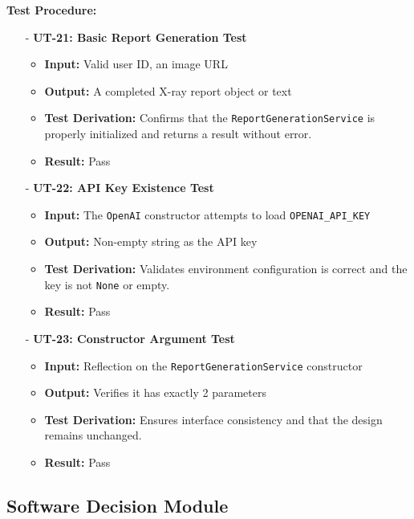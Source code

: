 \documentclass[12pt, titlepage]{article}
\begin{document}
\noindent \textbf{Test Procedure:}
\begin{itemize}
    \item[-] \textbf{UT-21: Basic Report Generation Test} \label{test:xray-basic-report}
    \begin{itemize}
        \item \textbf{Input:} Valid user ID, an image URL
        \item \textbf{Output:} A completed X-ray report object or text
        \item \textbf{Test Derivation:} Confirms that the \texttt{ReportGenerationService} is properly initialized and returns a result without error.
        \item \textbf{Result:} Pass
    \end{itemize}

    \item[-] \textbf{UT-22: API Key Existence Test} \label{test:xray-apikey}
    \begin{itemize}
        \item \textbf{Input:} The \texttt{OpenAI} constructor attempts to load \verb|OPENAI_API_KEY|
        \item \textbf{Output:} Non-empty string as the API key
        \item \textbf{Test Derivation:} Validates environment configuration is correct and the key is not \texttt{None} or empty.
        \item \textbf{Result:} Pass
    \end{itemize}

    \item[-] \textbf{UT-23: Constructor Argument Test} \label{test:xray-ctor-arg}
    \begin{itemize}
        \item \textbf{Input:} Reflection on the \texttt{ReportGenerationService} constructor
        \item \textbf{Output:} Verifies it has exactly 2 parameters
        \item \textbf{Test Derivation:} Ensures interface consistency and that the design remains unchanged.
        \item \textbf{Result:} Pass
    \end{itemize}
\end{itemize}
\vspace{10pt}


\subsection{Software Decision Module}
\end{document}
